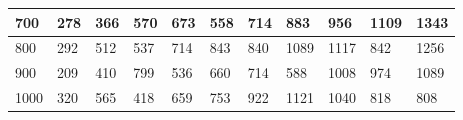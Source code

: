 \documentclass[10pt,letterpaper]{article}
\begin{document}
\begin{center}
\begin{table}
\begin{tabular} { |m{0.5cm}|m{1.3cm}|m{1.3cm}|m{1.3cm}|m{1.3cm}|m{1.3cm}|m{1.3cm}|m{1.3cm}|m{1.3cm}|m{1.3cm}|m{1.3cm}|}
\hline
\cellcolor{Gray}700 & \Large 278 & \Large 366 & \Large 570 & \Large 673 & \Large 558 & \Large 714 & \Large 883 & \Large 956 & \Large 1109 & \Large 1343 \\
\hline
\cellcolor{Gray}800 & \Large 292 & \Large 512 & \Large 537 & \Large 714 & \Large 843 & \Large 840 & \Large 1089 & \Large 1117 & \Large 842 & \Large 1256 \\
\hline
\cellcolor{Gray}900 & \Large 209 & \Large 410 & \Large 799 & \Large 536 & \Large 660 & \Large 714 & \Large 588 & \Large 1008 & \Large 974 & \Large 1089 \\
\hline
\cellcolor{Gray}1000 & \Large 320 & \Large 565 & \Large 418 & \Large 659 & \Large 753 & \Large 922 & \Large 1121 & \Large 1040 & \Large 818 & \Large 808 \\
\hline
\end{tabular} \\
\end{table}
\end{center}
\newpage 
{}
\end{document}
